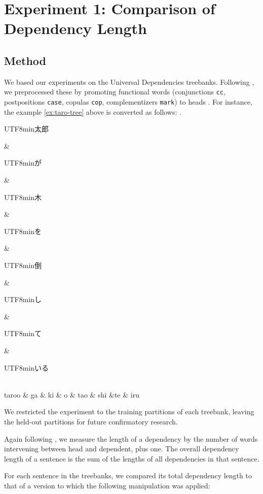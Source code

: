\documentclass[11pt,a4paper]{article}
\newcommand{\japanese}[1]{\begin{CJK}{UTF8}{min}#1\end{CJK}}
\begin{document}

\section{Experiment 1: Comparison of Dependency Length}

\subsection{Method}

We based our experiments on the Universal Dependencies treebanks.
Following \cite{futrell2015largescale}, we preprocessed these by promoting functional words
(conjunctions \texttt{cc}, 
postpositions \texttt{case},
copulas \texttt{cop},
complementizers \texttt{mark}) to heads \citep{osborne2019status}.
For instance, the example \ref{ex:taro-tree} above is converted as follows:
\ex.
\begin{dependency}[theme = simple]
   \begin{deptext}[column sep=1em]
          \japanese{太郎} \& \japanese{が} \& \japanese{木} \& \japanese{を} \& \japanese{倒} \& \japanese{し} \& \japanese{て} \& \japanese{いる} \\
          taroo \& ga \& ki \& o \& tao \& shi \&te \& iru \\ 
   \end{deptext}
\end{dependency}


We restricted the experiment to the training partitions of each treebank, leaving the held-out partitions for future confirmatory research. %

Again following \cite{futrell2015largescale}, we measure the length of a dependency by the number of words intervening between head and dependent, plus one. 
The overall dependency length of a sentence is the sum of the lengths of all dependencies in that sentence.

For each sentence in the treebanks, we compared its total dependency length to that of a version to which the following manipulation was applied: %
\end{document}
